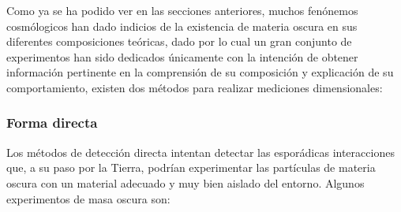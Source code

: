 Como ya se ha podido ver en las secciones anteriores, muchos fenónemos cosmólogicos han dado indicios de la existencia de materia oscura en sus diferentes composiciones teóricas, dado por lo cual un gran conjunto de experimentos han sido dedicados únicamente con la intención de obtener información pertinente en la comprensión de su composición y explicación de su comportamiento, existen dos métodos para realizar mediciones dimensionales:

\subsubsection{Forma directa}
Los métodos de detección directa intentan detectar las esporádicas interacciones que, a su paso por la Tierra, podrían experimentar
las partículas de materia oscura con un material adecuado y muy bien aislado del entorno.%
Algunos experimentos de masa oscura son:

